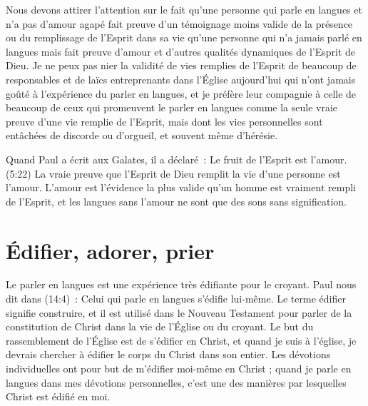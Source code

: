 Nous devons attirer l'attention sur le fait qu'une personne qui parle
 en langues et n'a pas d'amour agapé fait preuve d'un témoignage
 moins valide de la présence ou du remplissage de l'Esprit dans sa vie
 qu'une personne qui n'a jamais parlé en langues mais fait preuve d'amour
 et d'autres qualités dynamiques de l'Esprit de Dieu.
 Je ne peux pas nier la validité de vies remplies de l'Esprit de beaucoup
 de responsables et de laïcs entreprenants dans l'Église aujourd'hui
 qui n'ont jamais goûté à l'expérience du parler en langues,
 et je préfère leur compagnie à celle de beaucoup de ceux qui promeuvent
 le parler en langues comme la seule vraie preuve d'une vie remplie
 de l'Esprit, mais dont les vies personnelles sont entâchées de discorde
 ou d'orgueil, et souvent même d'hérésie.

Quand Paul a écrit aux Galates, il a déclaré~:
 \og Le fruit de l'Esprit est l'amour. \fg{}(5:22)
 La vraie preuve que l'Esprit de Dieu remplit la vie d'une personne
 est l'amour. L'amour est l'évidence la plus valide qu'un homme
 est vraiment rempli de l'Esprit, et les langues sans l'amour
 ne sont que des sons sans signification.


\section{\'Edifier, adorer, prier}

\begin{specialpar}{}
Le parler en langues est une expérience très édifiante pour le croyant.
 Paul nous dit dans (14:4)~:
 \og Celui qui parle en langues s'édifie lui-même. \fg{}
 Le terme \og édifier \fg{} signifie construire, et il est utilisé
 dans le Nouveau Testament pour parler de la constitution de Christ
 dans la vie de l'Église ou du croyant. Le but du rassemblement de l'Église
 est de s'édifier en Christ, et quand je suis à l'église,
 je devrais chercher à édifier le corps du Christ dans son entier.
 Les dévotions individuelles ont pour but de m'édifier moi-même en Christ ;
 quand je parle en langues dans mes dévotions personnelles,
 c'est une des manières par lesquelles Christ est édifié en moi.
\end{specialpar}

